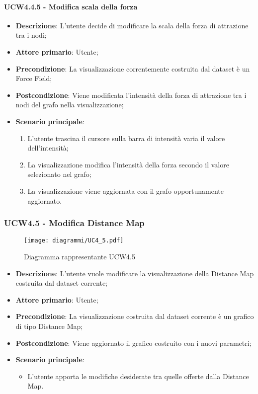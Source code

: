 \paragraph{UCW4.4.5 - Modifica scala della forza}
\label{par:ucw4.4.5}
\begin{itemize}
    \item \textbf{Descrizione}: L’utente decide di modificare la scala della forza di attrazione tra i nodi;


    \item \textbf{Attore primario}: Utente;

    \item \textbf{Precondizione}:   La visualizzazione correntemente costruita dal dataset è un Force Field;
    \item \textbf{Postcondizione}:  Viene modificata l'intensità della forza di attrazione tra i nodi del grafo nella visualizzazione;

	\item \textbf{Scenario principale}:
        \begin{enumerate}
            \item L'utente trascina il cursore sulla barra di intensità varia il valore dell’intensità;
            \item La visualizzazione modifica l'intensità della forza secondo il valore selezionato nel grafo;
            \item La visualizzazione viene aggiornata con il grafo opportunamente aggiornato.
        \end{enumerate}
\end{itemize}

\newpage
\subsubsection{UCW4.5 - Modifica Distance Map}
\label{ssub:ucw4.5}
\begin{figure}[h]
    \centering
    \texttt{[image: diagrammi/UC4\_5.pdf]}
    \caption{Diagramma rappresentante UCW4.5}
    \label{fig:UCW4.5}
\end{figure}

\begin{itemize}
    \item \textbf{Descrizione}: L'utente vuole modificare la visualizzazione della Distance Map costruita dal dataset corrente;
    \item \textbf{Attore primario}: Utente;
    \item \textbf{Precondizione}: La visualizzazione costruita dal dataset corrente è un grafico di tipo Distance Map;
    \item \textbf{Postcondizione}: Viene aggiornato il grafico costruito con i nuovi parametri;
    \item \textbf{Scenario principale}:
    \begin{itemize}
        \item L'utente apporta le modifiche desiderate tra quelle offerte dalla Distance Map.
    \end{itemize}
\end{itemize}

